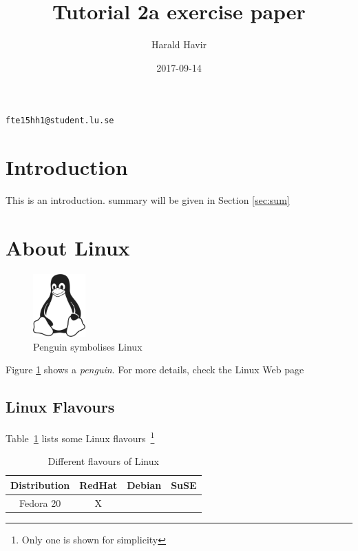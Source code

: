 \documentclass[a4paper,10pt,twoside]{article}
\author{Harald Havir}
\title{Tutorial 2a exercise paper}
\date{2017-09-14}
\begin{document}
 \maketitle
 
 \begin{center}
  \texttt{fte15hh1@student.lu.se}
 \end{center}
 \section{Introduction}
 \label{sec:intro}
 This is an introduction. summary will be given in Section \ref{sec:sum}
 
 \section{About Linux}
 \label{sec:linux}
 
 \begin{figure}[h]
 \begin{center}
  \includegraphics[width=2cm]{Tux.png}
  \caption{Penguin symbolises Linux}
  \label{fig:penguin}
 \end{center}
  
 \end{figure}

 Figure \ref{fig:penguin} shows a \textit{penguin}. For more details, check the Linux Web page~\cite{linux}
 \subsection{Linux Flavours}
  \label{sec:flavours}
  
  Table~\ref{tab:flavours} lists some Linux flavours~\footnote{Only one is shown for simplicity}
  
  \begin{table}[h]
   \begin{center}
    
    \label{tab:flavours}
    \begin{tabular}{c|c|c|c} %
     \textbf{Distribution} & RedHat & Debian & SuSE \\ \hline \hline
      Fedora 20 	& X	& 	&	\\ \hline
    \end{tabular}
    \caption{Different flavours of Linux}
   \end{center} 
  \end{table}
\end{document}
